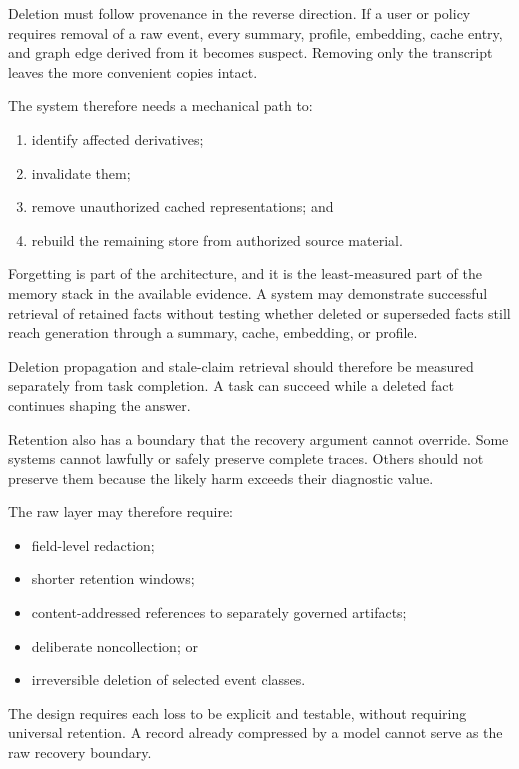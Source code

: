 Deletion must follow provenance in the reverse direction. If a user or policy requires removal of a raw event, every summary, profile, embedding, cache entry, and graph edge derived from it becomes suspect. Removing only the transcript leaves the more convenient copies intact.

The system therefore needs a mechanical path to:

\begin{enumerate}
\def\labelenumi{\arabic{enumi}.}
\tightlist
\item
  identify affected derivatives;
\item
  invalidate them;
\item
  remove unauthorized cached representations; and
\item
  rebuild the remaining store from authorized source material.
\end{enumerate}

Forgetting is part of the architecture, and it is the least-measured part of the memory stack in the available evidence. A system may demonstrate successful retrieval of retained facts without testing whether deleted or superseded facts still reach generation through a summary, cache, embedding, or profile.

Deletion propagation and stale-claim retrieval should therefore be measured separately from task completion. A task can succeed while a deleted fact continues shaping the answer.

Retention also has a boundary that the recovery argument cannot override. Some systems cannot lawfully or safely preserve complete traces. Others should not preserve them because the likely harm exceeds their diagnostic value.

The raw layer may therefore require:

\begin{itemize}
\tightlist
\item
  field-level redaction;
\item
  shorter retention windows;
\item
  content-addressed references to separately governed artifacts;
\item
  deliberate noncollection; or
\item
  irreversible deletion of selected event classes.
\end{itemize}

The design requires each loss to be explicit and testable, without requiring universal retention. A record already compressed by a model cannot serve as the raw recovery boundary.

